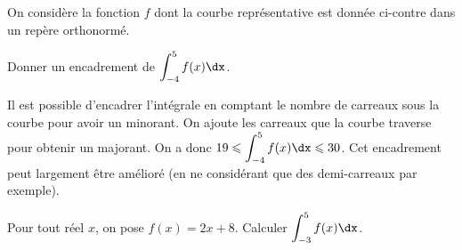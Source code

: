 \documentclass[11pt,fleqn, openany]{book} %
\begin{document}
\begin{exercise}[topic=int01]

\begin{minipage}{0.55\linewidth}
On considère la fonction $f$ dont la courbe représentative est donnée ci-contre dans un repère orthonormé.


Donner un encadrement de $\displaystyle\int_{-4}^5f(x)\dx$.

\end{minipage}\hfill\begin{minipage}{0.4\linewidth}
\end{minipage}
\end{exercise}

\begin{solution}
Il est possible d'encadrer l'intégrale en comptant le nombre de carreaux sous la courbe pour avoir un minorant. On ajoute les carreaux que la courbe traverse pour obtenir un majorant. On a donc \(19 \leqslant \displaystyle\int_{-4}^5f(x)\dx \leqslant 30\). Cet encadrement peut largement être amélioré (en ne considérant que des demi-carreaux par exemple).
\end{solution}



\begin{exercise}[topic=int01]Pour tout réel $x$, on pose $f(x)=2x+8$. Calculer $\displaystyle\int_{-3}^5 f(x)\dx$.\end{exercise}
\end{document}
